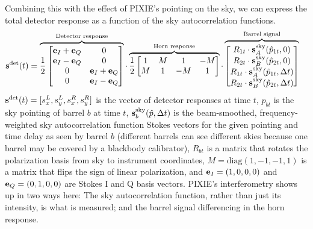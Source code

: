 \documentclass{article}
\renewcommand{\vec}[1]{{\bf #1}}
\begin{document}
Combining this with the effect of PIXIE's pointing on the sky,
we can express the total detector response as a function of the
sky autocorrelation functions.
\begin{align}
\vec s^\textrm{det}(t) &= \overbrace{\frac12\begin{bmatrix}
	\vec e_I+\vec e_Q & 0 \\
	\vec e_I-\vec e_Q & 0 \\
	0 & \vec e_I+\vec e_Q  \\
	0 & \vec e_I-\vec e_Q \end{bmatrix}}^\textrm{Detector response}
	\cdot
	\overbrace{\frac12\begin{bmatrix}
	1 &  M &  1 & -M \\
	M &  1 & -M &  1
	\end{bmatrix}}^\textrm{Horn response}
	\cdot
	\overbrace{\begin{bmatrix}
	R_{1t}\cdot\vec s^\textrm{sky}_A(\hat p_{1t},0) \\
	R_{2t}\cdot\vec s^\textrm{sky}_B(\hat p_{2t},0) \\
	R_{1t}\cdot\vec s^\textrm{sky}_A(\hat p_{1t},\Delta t) \\
	R_{2t}\cdot\vec s^\textrm{sky}_B(\hat p_{2t},\Delta t)
	\end{bmatrix}}^\textrm{Barrel signal}
	\label{eq:response}
\end{align}
$\vec s^\textrm{det}(t) = [s^L_x, s^L_y, s^R_x, s^R_y]$ is the vector of
detector responses at time $t$,
$\hat p_{bt}$ is the sky pointing of barrel $b$ at time $t$,
$\vec s^\textrm{sky}_b(\hat p,\Delta t)$ is the beam-smoothed,
frequency-weighted sky autocorrelation
function Stokes vectors for the given pointing and time delay as
seen by barrel $b$
(different barrels can see different skies because one barrel may
be covered by a blackbody calibrator),
$R_{bt}$ is
a matrix that rotates the polarization basis from sky to instrument
coordinates, $M = \textrm{diag}(1,-1,-1,1)$ is a matrix that flips
the sign of linear polarization,
and $\vec e_I = (1,0,0,0)$ and $\vec e_Q = (0,1,0,0)$ are Stokes
I and Q basis vectors. PIXIE's interferometry shows up in two ways here:
The sky autocorrelation function, rather than just its intensity,
is what is measured; and the barrel signal differencing in the horn
response.
\end{document}
